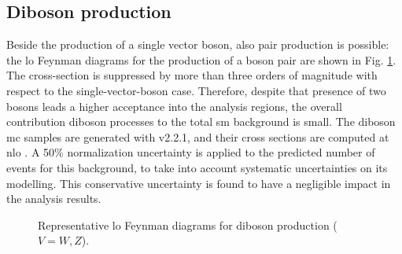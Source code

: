 \subsection{Diboson production}

Beside the production of a single vector boson, also pair production is possible: 
the \gls{lo} Feynman diagrams for the production of a boson pair are shown in Fig. \ref{fig:dib_prod}.
The cross-section is suppressed by more than three orders of magnitude with respect to the 
single-vector-boson case. 
Therefore, despite that presence of two bosons leads a higher acceptance into the analysis regions,
the overall contribution diboson processes to the total \gls{sm} background is small. 
The diboson \gls{mc} samples are generated with \Sherpa v2.2.1, and their cross sections are computed at \gls{nlo} \cite{ATL-PHYS-PUB-2016-002,ATL-PHYS-PUB-2017-005}.
A 50\% normalization uncertainty is applied to the predicted number of events for this background, to take into account 
systematic uncertainties on its modelling. This conservative uncertainty is found to have a negligible impact in the analysis results. 


\begin{figure}[h!]
\centering 
{}
\caption{Representative \gls{lo} Feynman diagrams for diboson production  ($V=W, Z$).}\label{fig:dib_prod}
\end{figure}


